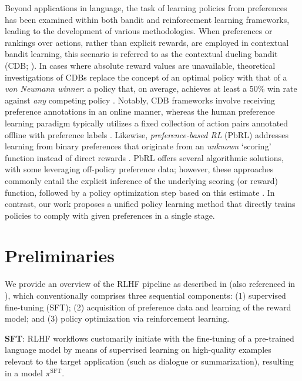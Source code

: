Beyond applications in language, the task of learning policies from preferences has been examined within both bandit and reinforcement learning frameworks, leading to the development of various methodologies. When preferences or rankings over actions, rather than explicit rewards, are employed in contextual bandit learning, this scenario is referred to as the contextual dueling bandit (CDB; \cite{yue2012karmed,dudik2015contextual}). In cases where absolute reward values are unavailable, theoretical investigations of CDBs replace the concept of an optimal policy with that of a \textit{von Neumann winner}: a policy that, on average, achieves at least a 50\% win rate against \textit{any} competing policy \citep{dudik2015contextual}. Notably, CDB frameworks involve receiving preference annotations in an online manner, whereas the human preference learning paradigm typically utilizes a fixed collection of action pairs annotated offline with preference labels \citep{yan2022human}. Likewise, \textit{preference-based RL} (PbRL) addresses learning from binary preferences that originate from an \textit{unknown} `scoring' function instead of direct rewards \citep{BusaFekete2014,ruiz2023dueling}. PbRL offers several algorithmic solutions, with some leveraging off-policy preference data; however, these approaches commonly entail the explicit inference of the underlying scoring (or reward) function, followed by a policy optimization step based on this estimate \citep{jain2013learning,BusaFekete2014,christiano2017deep,sadigh2017active,kupcsik2018learning}. In contrast, our work proposes a unified policy learning method that directly trains policies to comply with given preferences in a single stage.

\section{Preliminaries}\label{section:prelims}

We provide an overview of the RLHF pipeline as described in \citeauthor{ziegler2020finetuning} (also referenced in \citep{stiennon2022learning, bai2022training, ouyang2022training}), which conventionally comprises three sequential components: (1) supervised fine-tuning (SFT); (2) acquisition of preference data and learning of the reward model; and (3) policy optimization via reinforcement learning.

\textbf{SFT}: RLHF workflows customarily initiate with the fine-tuning of a pre-trained language model by means of supervised learning on high-quality examples relevant to the target application (such as dialogue or summarization), resulting in a model $\pi^\text{SFT}$.

